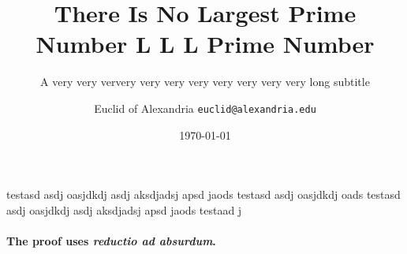 \documentclass[aspectratio=169]{beamer}
\title{There Is No Largest Prime Number L L L Prime Number}
\subtitle{A very very ververy very very very very very very very long subtitle}
\date{\today}
\author[Euclid]{Euclid of Alexandria \texttt{euclid@alexandria.edu}}
\begin{document}
	

\begin{frame}
\titlepage
\end{frame}


\begin{frame}{testasd asdj oasjdkdj asdj aksdjadsj apsd jaods testasd asdj oasjdkdj oads testasd asdj oasjdkdj asdj aksdjadsj apsd jaods testaad j}
	
	\framesubtitle{The proof uses \textit{reductio ad absurdum}.} 
	\blindtext[2]
\end{frame}
\end{document}
